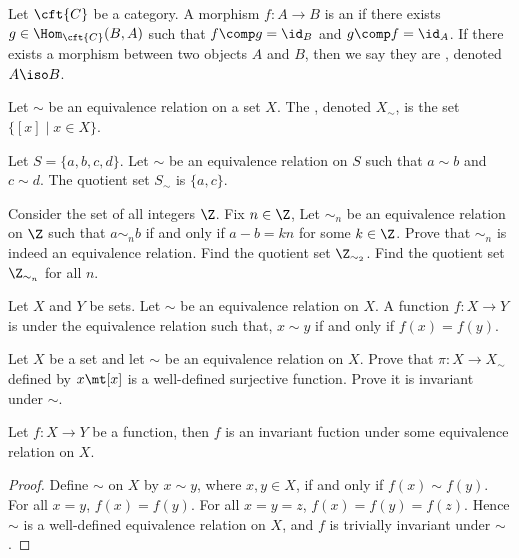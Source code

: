 \documentclass[10pt]{article}
\begin{document}
\begin{definition}
    Let $\cft{C}$ be a category. A morphism $f:A\to B$ is an  if there exists $g\in{\Hom}_{\cft{C}}(B,A)$ such that $f\comp g={\id}_{B}$ and $g\comp f={\id}_{A}$. If there exists a morphism between two objects $A$ and $B$, then we say they are , denoted $A\iso B$.
\end{definition}
\begin{definition}
    Let $\sim$ be an equivalence relation on a set $X$. The , denoted ${X}_{\sim}$, is the set $\{[x]\mid x\in X\}$.
\end{definition}
\begin{example}
    Let $S=\{a,b,c,d\}$. Let $\sim$ be an equivalence relation on $S$ such that $a\sim b$ and $c\sim d$. The quotient set ${S}_{\sim}$ is $\{a,c\}$.
\end{example}
\begin{problem}
    Consider the set of all integers $\Z$. Fix $n\in\Z$, Let ${\sim}_{n}$ be an equivalence relation on $\Z$ such that $a{\sim}_{n}b$ if and only if $a-b=kn$ for some $k\in\Z$. Prove that ${\sim}_{n}$ is indeed an equivalence relation. Find the quotient set ${\Z}_{{\sim}_{2}}$. Find the quotient set ${\Z}_{{\sim}_{n}}$ for all $n$.
\end{problem}
\begin{definition}
    Let $X$ and $Y$ be sets. Let $\sim$ be an equivalence relation on $X$. A function $f:X\to Y$ is  under the equivalence relation such that, $x\sim y$ if and only if $f(x)=f(y)$.
\end{definition}
\begin{problem}
    Let $X$ be a set and let $\sim$ be an equivalence relation on $X$. Prove that $\pi:X\to{X}_{\sim}$ defined by $x\mt[x]$ is a well-defined surjective function. Prove it is invariant under $\sim$.
\end{problem}
\begin{proposition}
    Let $f:X\to Y$ be a function, then $f$ is an invariant fuction under some equivalence relation on $X$.
\end{proposition}
\begin{proof}
    Define $\sim$ on $X$ by $x\sim y$, where $x,y\in X$, if and only if $f(x)\sim f(y)$. For all $x=y$, $f(x)=f(y)$. For all $x=y=z$, $f(x)=f(y)=f(z)$. Hence $\sim$ is a well-defined equivalence relation on $X$, and $f$ is trivially invariant under $\sim$.
\end{proof}
\end{document}
